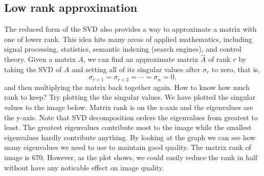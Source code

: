 \subsection{Low rank approximation}

The reduced form of the SVD also provides a way to approximate a
matrix with one of lower rank. This idea hits many areas of applied
mathematics, including signal processing, statistics, semantic
indexing (search engines), and control theory.  Given a matrix $A$,
we can find an approximate matrix $\widehat A$ of rank $r$ by taking
the SVD of $A$ and setting all of its singular values after
$\sigma_r$ to zero, that is,
\[
\sigma_{r+1} = \sigma_{r+2} = \cdots = \sigma_n = 0,
\]
and then multiplying the matrix back together again.  How to know how much rank
to keep?  Try plotting the the singular values.  We have plotted the singular values to the image below.  Matrix rank is on the x-axis and the eigenvalues are the y-axis.  Note that SVD decomposition orders the eigenvalues from greatest to least.  The greatest eigenvalues contribute most to the image while the smallest eigenvalues hardly contribute anything.  By looking at the graph we can see how many eigenvalues we need to use to maintain good quality.  The matrix rank of image is $670$.  However, as the plot shows, we could easily reduce the rank in half without have any noticable effect on image quality.

